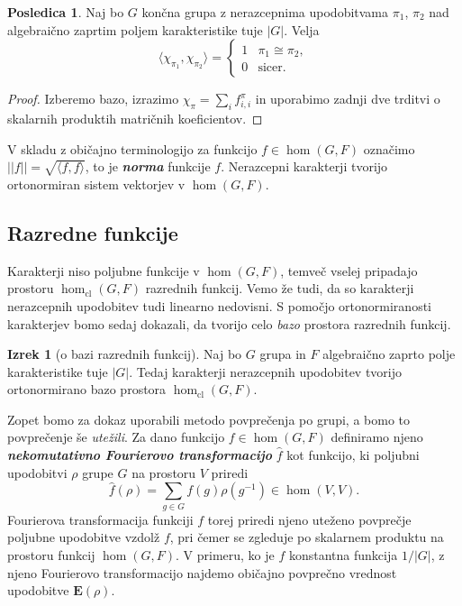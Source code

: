 \documentclass[11pt]{book}
\def\EE{\mathbf{E}}
\DeclareMathOperator\cl{cl}
\def\definicija{\color{rdeca}\bf\em}
\theoremstyle{definition}
\theoremstyle{zgled}
\theoremstyle{odprtproblem}
\theoremstyle{domacanaloga}
\newenvironment{dokaz}
    {\color{siva}\begin{proof}}
    {\end{proof}}
\theoremstyle{izrek}
\newtheorem*{izrek}{Izrek}
\newtheorem*{posledica}{Posledica}
\begin{document}
\begin{posledica}
Naj bo $G$ končna grupa z nerazcepnima upodobitvama $\pi_1$, $\pi_2$ nad algebraično zaprtim poljem karakteristike tuje $|G|$. Velja
\[
    \langle \chi_{\pi_1}, \chi_{\pi_2} \rangle =
    \begin{cases}
        1 & \pi_1 \cong \pi_2, \\
        0 & \text{sicer.}
    \end{cases}
\]
\end{posledica}
\begin{dokaz}
Izberemo bazo, izrazimo $\chi_{\pi} = \sum_i f_{i,i}^{\pi}$ in uporabimo zadnji dve trditvi o skalarnih produktih matričnih koeficientov.
\end{dokaz}

V skladu z običajno terminologijo za funkcijo $f \in \hom(G,F)$ označimo $||f|| = \sqrt{\langle f, f \rangle}$, to je {\definicija norma} funkcije $f$. Nerazcepni karakterji tvorijo ortonormiran sistem vektorjev v $\hom(G,F)$.

\subsection{Razredne funkcije}

Karakterji niso poljubne funkcije v $\hom(G,F)$, temveč vselej pripadajo prostoru $\hom_{\cl}(G,F)$ razrednih funkcij. Vemo že tudi, da so karakterji nerazcepnih upodobitev tudi linearno nedovisni. S pomočjo ortonormiranosti karakterjev bomo sedaj dokazali, da tvorijo celo \emph{bazo} prostora razrednih funkcij. 

\begin{izrek}[o bazi razrednih funkcij]
    Naj bo $G$ grupa in $F$ algebraično zaprto polje karakteristike tuje $|G|$. Tedaj karakterji nerazcepnih upodobitev tvorijo ortonormirano bazo prostora $\hom_{\cl}(G,F)$.
\end{izrek}

Zopet bomo za dokaz uporabili metodo povprečenja po grupi, a bomo to povprečenje še \emph{utežili}. Za dano funkcijo $f \in \hom(G,F)$ definiramo njeno {\definicija nekomutativno Fourierovo transformacijo} $\hat{f}$ kot funkcijo, ki poljubni upodobitvi $\rho$ grupe $G$ na prostoru $V$ priredi
\[
    \hat{f}(\rho) = \sum_{g \in G} f(g) \rho(g^{-1}) \in \hom(V,V).
\]
Fourierova transformacija funkciji $f$ torej priredi njeno uteženo povprečje poljubne upodobitve vzdolž $f$, pri čemer se zgleduje po skalarnem produktu na prostoru funkcij $\hom(G,F)$. V primeru, ko je $f$ konstantna funkcija $1/|G|$, z njeno Fourierovo transformacijo najdemo običajno povprečno vrednost upodobitve $\EE(\rho)$.
\end{document}
